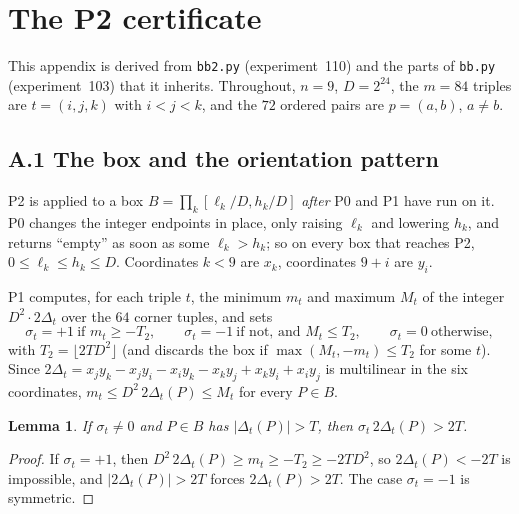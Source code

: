 \documentclass[11pt]{amsart}
\newtheorem{lemma}[theorem]{Lemma}
\theoremstyle{definition}
\begin{document}
\appendix

\section{The P2 certificate}\label{app:p2}

This appendix is derived from \texttt{bb2.py} (experiment~110) and the parts of \texttt{bb.py} (experiment~103) that it inherits. Throughout, $n = 9$, $D = 2^{24}$, the $m = 84$ triples are $t = (i,j,k)$ with $i<j<k$, and the $72$ ordered pairs are $p = (a,b)$, $a \ne b$.

\subsection*{A.1 The box and the orientation pattern}
P2 is applied to a box $B = \prod_k [\ell_k/D, h_k/D]$ \emph{after} P0 and P1 have run on it. P0 changes the integer endpoints in place, only raising $\ell_k$ and lowering $h_k$, and returns ``empty'' as soon as some $\ell_k > h_k$; so on every box that reaches P2, $0 \le \ell_k \le h_k \le D$. Coordinates $k < 9$ are $x_k$, coordinates $9 + i$ are $y_i$.

P1 computes, for each triple $t$, the minimum $m_t$ and maximum $M_t$ of the integer $D^2\cdot 2\Delta_t$ over the $64$ corner tuples, and sets
\[
 \sigma_t = +1 \ \text{if } m_t \ge -T_2,\qquad \sigma_t = -1 \ \text{if not, and } M_t \le T_2,\qquad \sigma_t = 0 \ \text{otherwise},
\]
with $T_2 = \lfloor 2TD^2\rfloor$ (and discards the box if $\max(M_t,-m_t) \le T_2$ for some $t$). Since $2\Delta_t = x_jy_k - x_jy_i - x_iy_k - x_ky_j + x_ky_i + x_iy_j$ is multilinear in the six coordinates, $m_t \le D^2\,2\Delta_t(P) \le M_t$ for every $P \in B$.

\begin{lemma}\label{lem:orient}
If $\sigma_t \ne 0$ and $P \in B$ has $\lvert\Delta_t(P)\rvert > T$, then $\sigma_t\,2\Delta_t(P) > 2T$.
\end{lemma}
\begin{proof}
If $\sigma_t = +1$, then $D^2\,2\Delta_t(P) \ge m_t \ge -T_2 \ge -2TD^2$, so $2\Delta_t(P) < -2T$ is impossible, and $\lvert 2\Delta_t(P)\rvert > 2T$ forces $2\Delta_t(P) > 2T$. The case $\sigma_t = -1$ is symmetric.
\end{proof}
\end{document}
